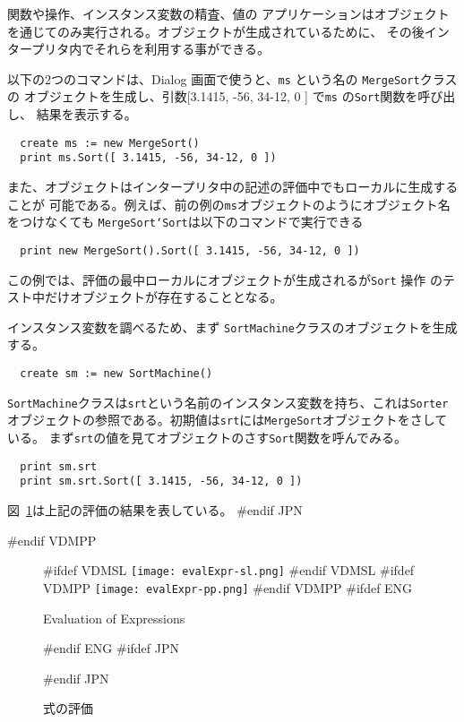 \documentclass[\pformat,12pt]{article}
\newcommand{\aaa}{\tt }
\newcommand{\guicmd}[1]{{\sf #1}}
\newcommand{\guicmd}[1]{{\gt #1}}
\begin{document}
関数や操作、インスタンス変数の精査、値の
アプリケーションはオブジェクトを通じてのみ実行される。オブジェクトが生成されているために、
その後インタープリタ内でそれらを利用する事ができる。

以下の2つのコマンドは、\guicmd{Dialog} 画面で使うと、{\aaa ms} という名の {\aaa MergeSort}クラスの
オブジェクトを生成し、引数[3.1415, -56, 34-12, 0 ] で{\tt ms} の{\tt Sort}関数を呼び出し、
結果を表示する。

\begin{verbatim}
  create ms := new MergeSort()
  print ms.Sort([ 3.1415, -56, 34-12, 0 ])
\end{verbatim}

また、オブジェクトはインタープリタ中の記述の評価中でもローカルに生成することが
可能である。例えば、前の例の{\tt ms}オブジェクトのようにオブジェクト名をつけなくても
{\tt MergeSort`Sort}は以下のコマンドで実行できる 

\begin{verbatim}
  print new MergeSort().Sort([ 3.1415, -56, 34-12, 0 ])
\end{verbatim}

この例では、評価の最中ローカルにオブジェクトが生成されるが{\tt Sort} 操作
のテスト中だけオブジェクトが存在することとなる。

インスタンス変数を調べるため、まず {\tt SortMachine}クラスのオブジェクトを生成する。

\begin{verbatim}
  create sm := new SortMachine()
\end{verbatim}

{\tt SortMachine}クラスは{\tt srt}という名前のインスタンス変数を持ち、これは{\tt Sorter}
オブジェクトの参照である。初期値は{\tt srt}には{\tt MergeSort}オブジェクトをさしている。
まず{\tt srt}の値を見てオブジェクトのさす{\tt Sort}関数を呼んでみる。

\begin{verbatim}
  print sm.srt
  print sm.srt.Sort([ 3.1415, -56, 34-12, 0 ])
\end{verbatim}

図~\ref{fig:evalgui}は上記の評価の結果を表している。
#endif JPN

#endif VDMPP

\begin{figure}[tbh]
\begin{center}
\mbox{}
#ifdef VDMSL
\texttt{[image: evalExpr-sl.png]}
#endif VDMSL
#ifdef VDMPP
\texttt{[image: evalExpr-pp.png]}
#endif VDMPP
#ifdef ENG
\caption{Evaluation of Expressions}
#endif ENG
#ifdef JPN
\caption{式の評価}
#endif JPN
\label{fig:evalgui}
\end{center}
\end{figure}
\end{document}
